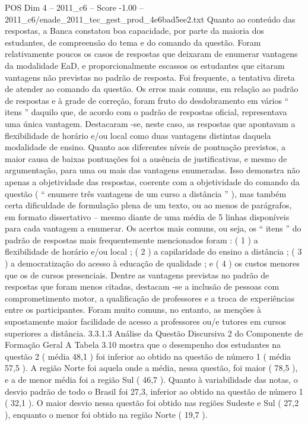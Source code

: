 \begin{textsample}{POS Dim 4 – 2011\_c6 – Score -1.00 – 2011\_c6/enade\_2011\_tec\_gest\_prod\_4e6bad5ee2.txt}
Quanto ao conteúdo das respostas, a Banca constatou boa capacidade, por parte da maioria dos estudantes, de compreensão do tema e do comando da questão.
Foram relativamente poucos os casos de respostas que deixaram de enumerar vantagens da modalidade EaD, e proporcionalmente escassos os estudantes que citaram vantagens não previstas no padrão de resposta.
Foi frequente, a tentativa direta de atender ao comando da questão.
Os erros mais comuns, em relação ao padrão de respostas e à grade de correção, foram fruto do desdobramento em vários “ itens ” daquilo que, de acordo com o padrão de respostas oficial, representava uma única vantagem.
Destacaram -se, neste caso, as respostas que apontavam a flexibilidade de horário e/ou local como duas vantagens distintas daquela modalidade de ensino.
Quanto aos diferentes níveis de pontuação previstos, a maior causa de baixas pontuações foi a ausência de justificativas, e mesmo de argumentação, para uma ou mais das vantagens enumeradas.
Isso demonstra não apenas a objetividade das respostas, coerente com a objetividade do comando da questão ( “ enumere três vantagens de um curso a distância ” ), mas também certa dificuldade de formulação plena de um texto, ou ao menos de parágrafos, em formato dissertativo – mesmo diante de uma média de 5 linhas disponíveis para cada vantagem a enumerar.
Os acertos mais comuns, ou seja, os “ itens ” do padrão de respostas mais frequentemente mencionados foram : ( 1 ) a flexibilidade de horário e/ou local ; ( 2 ) a capilaridade do ensino a distância ; ( 3 ) a democratização do acesso à educação de qualidade ; e ( 4 ) os custos menores que os de cursos presenciais.
Dentre as vantagens previstas no padrão de respostas que foram menos citadas, destacam -se a inclusão de pessoas com comprometimento motor, a qualificação de professores e a troca de experiências entre os participantes.
Foram muito comuns, no entanto, as menções à supostamente maior facilidade de acesso a professores ou/e tutores em cursos superiores a distância. 3.3.1.3 Análise da Questão Discursiva 2 do Componente de Formação Geral A Tabela 3.10 mostra que o desempenho dos estudantes na questão 2 ( média 48,1 ) foi inferior ao obtido na questão de número 1 ( média 57,5 ).
A região Norte foi aquela onde a média, nessa questão, foi maior ( 78,5 ), e a de menor média foi a região Sul ( 46,7 ).
Quanto à variabilidade das notas, o desvio padrão de todo o Brasil foi 27,3, inferior ao obtido na questão de número 1 ( 32,1 ).
O maior desvio nessa questão foi obtido nas regiões Sudeste e Sul ( 27,2 ), enquanto o menor foi obtido na região Norte ( 19,7 ).

\end{textsample}
